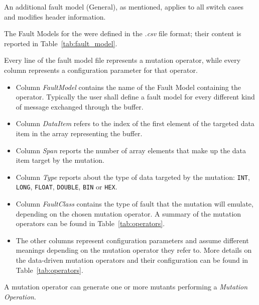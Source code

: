 An additional fault model (General), as mentioned, applies to all switch cases and modifies header information.

The Fault Models for the \case were defined in the \emph{.csv} file format; their content is reported in Table~\ref{tab:fault_model}.



Every line of the fault model file represents a mutation operator, while every column represents a configuration parameter for that operator.

\begin{itemize}
  \item Column \emph{FaultModel} contains the name of the Fault Model containing the operator. Typically the user shall define a fault model for every different kind of message exchanged through the buffer.

  \item Column \emph{DataItem} refers to the index of the first element of the targeted data item in the array representing the buffer.

  \item Column \emph{Span} reports the number of array elements that make up the data item target by the mutation.

  \item Column \emph{Type} reports about the type of data targeted by the mutation: \texttt{INT}, \texttt{LONG}, \texttt{FLOAT}, \texttt{DOUBLE}, \texttt{BIN} or \texttt{HEX}.

  \item Column \emph{FaultClass} contains the type of fault that the mutation will emulate, depending on the chosen mutation operator. A summary of the mutation operators can be found in Table~\ref{tab:operators}.

  \item The other columns represent configuration parameters and assume different meanings depending on the mutation operator they refer to. More details on the data-driven mutation operators and their configuration can be found in Table~\ref{tab:operators}.

\end{itemize}



A mutation operator can generate one or more mutants performing a \emph{Mutation Operation}.
